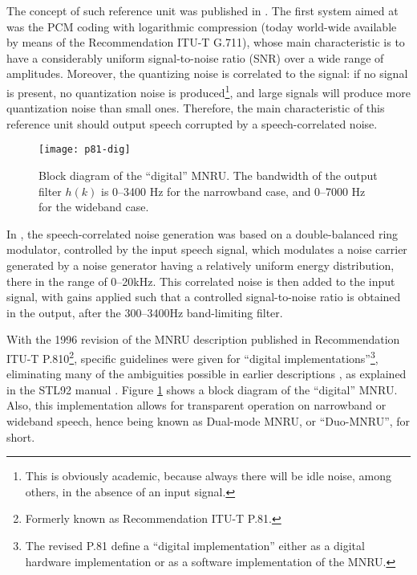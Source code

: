The concept of such reference unit was published in
\cite{Q001.02.04.02}.  The first system aimed at was the PCM coding
with logarithmic compression (today world-wide available by means of
the Recommendation ITU-T G.711), whose main characteristic is to have a
considerably uniform signal-to-noise ratio (SNR) over a wide range of
amplitudes.  Moreover, the quantizing noise is correlated to the
signal: if no signal is present, no quantization noise is
produced\footnote{\SF This is obviously academic, because always there
will be idle noise, among others, in the absence of an input signal.},
and large signals will produce more quantization noise than small
ones. Therefore, the main characteristic of this reference unit should
output speech corrupted by a speech-correlated noise.

 \begin{figure}[hpbt]
  \begin{center}
    \texttt{[image: p81-dig]}
  \end{center}
  \caption{Block diagram of the ``digital'' MNRU. The bandwidth of the
           output filter $h(k)$ is 0--3400 Hz for the narrowband
           case, and 0--7000 Hz for the wideband case.
           \label{1/P.810}}
 \end{figure}

In \cite{Q001.02.04.02}, the speech-correlated noise generation was
based on a double-balanced ring modulator, controlled by the input
speech signal, which modulates a noise carrier generated by a noise
generator having a relatively uniform energy distribution, there in the range
of 0--20kHz. This correlated noise is then added to the input signal, with
gains applied such that a controlled signal-to-noise ratio is obtained
in the output, after the 300--3400Hz band-limiting filter.

With the 1996 revision of the MNRU description published in 
Recommendation ITU-T P.810\footnote{\SF Formerly known as
Recommendation ITU-T P.81.}, specific guidelines were given for ``digital
implementations''\footnote{\SF The revised P.81 define a ``digital
implementation'' either as a digital hardware implementation or as a
software implementation of the MNRU.}, eliminating many of the
ambiguities possible in earlier descriptions \cite{Old-P.81}, as
explained in the STL92 manual \cite[Chapter 8]{STL92-Manual}. Figure
\ref{1/P.810} shows a block diagram of the ``digital'' MNRU. Also,
this implementation allows for transparent operation on narrowband
or wideband speech, hence being known as Dual-mode MNRU, or
``Duo-MNRU'', for short.

